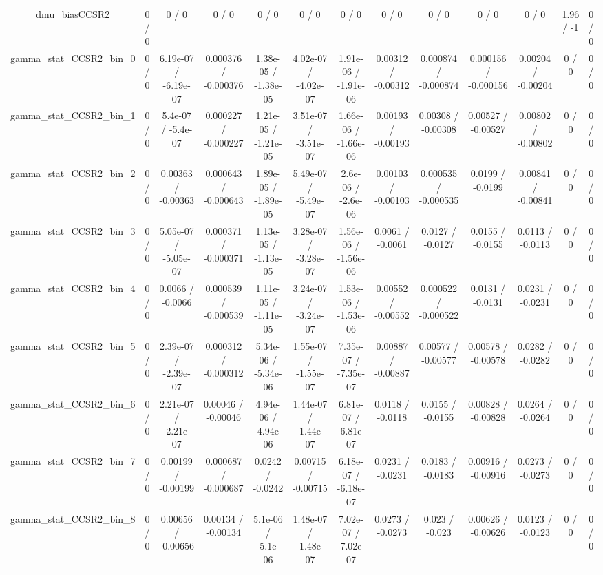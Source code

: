 \documentclass[10pt]{article}
\begin{document}
\begin{table}[htbp]
\begin{center}
\begin{tabular}{|c|c|c|c|c|c|c|c|c|c|c|c|c|}
  dmu_biasCCSR2 & 0 / 0 & 0 / 0 & 0 / 0 & 0 / 0 & 0 / 0 & 0 / 0 & 0 / 0 & 0 / 0 & 0 / 0 & 0 / 0 & 1.96 / -1 & 0 / 0 \\ 
  gamma_stat_CCSR2_bin_0 & 0 / 0 & 6.19e-07 / -6.19e-07 & 0.000376 / -0.000376 & 1.38e-05 / -1.38e-05 & 4.02e-07 / -4.02e-07 & 1.91e-06 / -1.91e-06 & 0.00312 / -0.00312 & 0.000874 / -0.000874 & 0.000156 / -0.000156 & 0.00204 / -0.00204 & 0 / 0 & 0 / 0 \\ 
  gamma_stat_CCSR2_bin_1 & 0 / 0 & 5.4e-07 / -5.4e-07 & 0.000227 / -0.000227 & 1.21e-05 / -1.21e-05 & 3.51e-07 / -3.51e-07 & 1.66e-06 / -1.66e-06 & 0.00193 / -0.00193 & 0.00308 / -0.00308 & 0.00527 / -0.00527 & 0.00802 / -0.00802 & 0 / 0 & 0 / 0 \\ 
  gamma_stat_CCSR2_bin_2 & 0 / 0 & 0.00363 / -0.00363 & 0.000643 / -0.000643 & 1.89e-05 / -1.89e-05 & 5.49e-07 / -5.49e-07 & 2.6e-06 / -2.6e-06 & 0.00103 / -0.00103 & 0.000535 / -0.000535 & 0.0199 / -0.0199 & 0.00841 / -0.00841 & 0 / 0 & 0 / 0 \\ 
  gamma_stat_CCSR2_bin_3 & 0 / 0 & 5.05e-07 / -5.05e-07 & 0.000371 / -0.000371 & 1.13e-05 / -1.13e-05 & 3.28e-07 / -3.28e-07 & 1.56e-06 / -1.56e-06 & 0.0061 / -0.0061 & 0.0127 / -0.0127 & 0.0155 / -0.0155 & 0.0113 / -0.0113 & 0 / 0 & 0 / 0 \\ 
  gamma_stat_CCSR2_bin_4 & 0 / 0 & 0.0066 / -0.0066 & 0.000539 / -0.000539 & 1.11e-05 / -1.11e-05 & 3.24e-07 / -3.24e-07 & 1.53e-06 / -1.53e-06 & 0.00552 / -0.00552 & 0.000522 / -0.000522 & 0.0131 / -0.0131 & 0.0231 / -0.0231 & 0 / 0 & 0 / 0 \\ 
  gamma_stat_CCSR2_bin_5 & 0 / 0 & 2.39e-07 / -2.39e-07 & 0.000312 / -0.000312 & 5.34e-06 / -5.34e-06 & 1.55e-07 / -1.55e-07 & 7.35e-07 / -7.35e-07 & 0.00887 / -0.00887 & 0.00577 / -0.00577 & 0.00578 / -0.00578 & 0.0282 / -0.0282 & 0 / 0 & 0 / 0 \\ 
  gamma_stat_CCSR2_bin_6 & 0 / 0 & 2.21e-07 / -2.21e-07 & 0.00046 / -0.00046 & 4.94e-06 / -4.94e-06 & 1.44e-07 / -1.44e-07 & 6.81e-07 / -6.81e-07 & 0.0118 / -0.0118 & 0.0155 / -0.0155 & 0.00828 / -0.00828 & 0.0264 / -0.0264 & 0 / 0 & 0 / 0 \\ 
  gamma_stat_CCSR2_bin_7 & 0 / 0 & 0.00199 / -0.00199 & 0.000687 / -0.000687 & 0.0242 / -0.0242 & 0.00715 / -0.00715 & 6.18e-07 / -6.18e-07 & 0.0231 / -0.0231 & 0.0183 / -0.0183 & 0.00916 / -0.00916 & 0.0273 / -0.0273 & 0 / 0 & 0 / 0 \\ 
  gamma_stat_CCSR2_bin_8 & 0 / 0 & 0.00656 / -0.00656 & 0.00134 / -0.00134 & 5.1e-06 / -5.1e-06 & 1.48e-07 / -1.48e-07 & 7.02e-07 / -7.02e-07 & 0.0273 / -0.0273 & 0.023 / -0.023 & 0.00626 / -0.00626 & 0.0123 / -0.0123 & 0 / 0 & 0 / 0 \\ 

\end{tabular}
\end{center}
\end{table}
\end{document}
